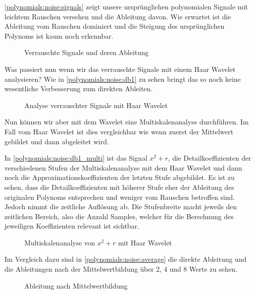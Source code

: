 \begin{refsection}
\autoref{polynomials:noise:signals} zeigt unsere ursprünglichen polynomialen
Signale mit leichtem Rauschen versehen und die Ableitung davon. Wie erwartet
ist die Ableitung vom Rauschen dominiert und die Steigung des ursprünglichen
Polynoms ist kaum noch erkennbar.

\begin{figure}
    \centering
    
    \caption{Verrauschte Signale und deren Ableitung\label{polynomials:noise:signals}}
\end{figure}

Was passiert nun wenn wir das verrauschte Signale mit einem Haar Wavelet
analysieren?  Wie in \autoref{polynomials:noise:db1} zu sehen bringt das so
noch keine wesentliche Verbesserung zum direkten Ableiten.

\begin{figure}
    \centering
    
    \caption{Analyse verrauschter Signale mit Haar Wavelet\label{polynomials:noise:db1}}
\end{figure}

Nun können wir aber mit dem Wavelet eine Multiskalenanalyse durchführen. Im
Fall vom Haar Wavelet ist dies vergleichbar wie wenn zuerst der Mittelwert
gebildet und dann abgeleitet wird. 

In \autoref{polynomials:noise:db1_multi} ist das Signal $x^2 + r$, die
Detailkoeffizienten der verschiedenen Stufen der Multiskalenanalyse mit dem
Haar Wavelet und dann noch die Approximationskoeffizienten der letzten Stufe
abgebildet. Es ist zu sehen, dass die Detailkoeffizienten mit höherer Stufe
eher der Ableitung des originalen Polynoms entsprechen und weniger vom Rauschen
betroffen sind. Jedoch nimmt die zeitliche Auflösung ab.
Die Stufenbreite macht jeweils den zeitlichen Bereich, also die Anzahl Samples,
welcher für die Berechnung des jeweiligen Koeffizienten relevant ist sichtbar.

\begin{figure}
    \centering
    
    \caption{Multiskalenanalyse von $x^2 + r$ mit Haar Wavelet\label{polynomials:noise:db1_multi}}
\end{figure}

Im Vergleich dazu sind in \autoref{polynomials:noise:average} die direkte
Ableitung und die Ableitungen nach der Mittelwertbildung über 2, 4 und 8 Werte
zu sehen.

\begin{figure}
    \centering
    
    \caption{Ableitung nach Mittelwertbildung\label{polynomials:noise:average}}
\end{figure}


\end{refsection}
